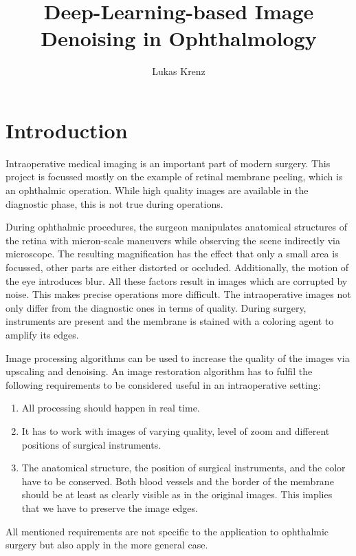 \documentclass{scrartcl}
\begin{document}
\title{Deep-Learning-based Image Denoising in Ophthalmology}
\author{Lukas Krenz}

\maketitle

\section{Introduction}
Intraoperative medical imaging is an important part of modern surgery.
This project is focussed mostly on the example of retinal membrane peeling, which is an ophthalmic operation.
While high quality images are available in the diagnostic phase, this is not true during operations.

During ophthalmic procedures, the surgeon manipulates anatomical structures of the retina with micron-scale maneuvers while observing the scene indirectly via microscope.
The resulting magnification has the effect that only a small area is focussed, other parts are either distorted or occluded.
Additionally, the motion of the eye introduces blur.
All these factors result in images which are corrupted by noise.
This makes precise operations more difficult.
The intraoperative images not only differ from the diagnostic ones in terms of quality.
During surgery, instruments are present and the membrane is stained with a coloring agent to amplify its edges.

Image processing algorithms can be used to increase the quality of the images via upscaling and denoising.
An image restoration algorithm has to fulfil the following requirements to be considered useful in an intraoperative setting:
\begin{enumerate}
\item All processing should happen in real time.
\item It has to work with images of varying quality, level of zoom and different positions of surgical instruments.
\item The anatomical structure, the position of surgical instruments, and the color have to be conserved.
Both blood vessels and the border of the membrane should be at least as clearly visible as in the original images.
This implies that we have to preserve the image edges.
\end{enumerate}
All mentioned requirements are not specific to the application to ophthalmic surgery but also apply in the more general case.
\end{document}
